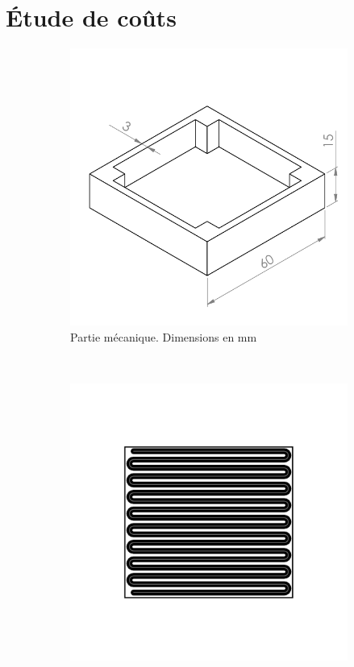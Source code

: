 \section{Étude de coûts}

\begin{figure}[h]
        \centering
        \begin{subfigure}[t]{0.4\textwidth}
            \includegraphics[width=\textwidth]{images/example_part/example_mid}
            \caption{Partie mécanique. Dimensions en \si{\milli\meter}}
        \end{subfigure}
        ~
        \begin{subfigure}[t]{0.4\textwidth}
                \includegraphics[width=\textwidth]{images/example_part/tracks.png}

\end{subfigure}
\end{figure}
